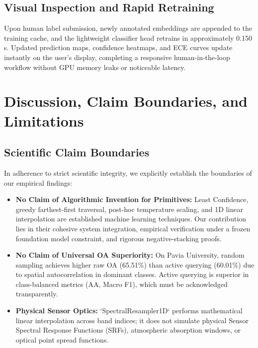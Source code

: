 \documentclass[conference,letterpaper]{IEEEtran}
\begin{document}
\subsection{Visual Inspection and Rapid Retraining}
Upon human label submission, newly annotated embeddings are appended to the training cache, and the lightweight classifier head retrains in approximately 0.150\,s. Updated prediction maps, confidence heatmaps, and ECE curves update instantly on the user's display, completing a responsive human-in-the-loop workflow without GPU memory leaks or noticeable latency.

\section{Discussion, Claim Boundaries, and Limitations}

\subsection{Scientific Claim Boundaries}
In adherence to strict scientific integrity, we explicitly establish the boundaries of our empirical findings:
\begin{itemize}
    \item \textbf{No Claim of Algorithmic Invention for Primitives:} Least Confidence, greedy farthest-first traversal, post-hoc temperature scaling, and 1D linear interpolation are established machine learning techniques. Our contribution lies in their cohesive system integration, empirical verification under a frozen foundation model constraint, and rigorous negative-stacking proofs.
    \item \textbf{No Claim of Universal OA Superiority:} On Pavia University, random sampling achieves higher raw OA (65.51\%) than active querying (60.01\%) due to spatial autocorrelation in dominant classes. Active querying is superior in class-balanced metrics (AA, Macro F1), which must be acknowledged transparently.
    \item \textbf{Physical Sensor Optics:} `SpectralResampler1D` performs mathematical linear interpolation across band indices; it does not simulate physical Sensor Spectral Response Functions (SRFs), atmospheric absorption windows, or optical point spread functions.
\end{itemize}
\end{document}
